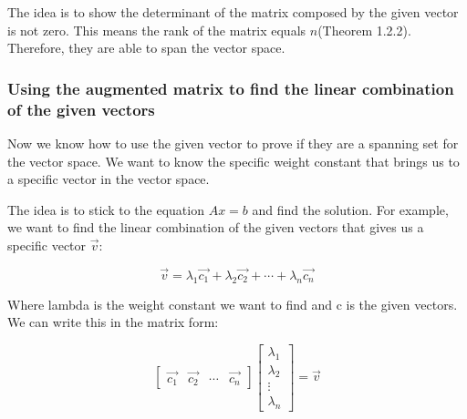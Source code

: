 \documentclass[oneside]{book}
\begin{document}
The idea is to show the determinant of the matrix composed by the given vector is not zero. This means the rank of the matrix equals $n$(Theorem 1.2.2). Therefore, they are able to span the vector space.



\subsubsection{Using the augmented matrix to find the linear combination of the given vectors}
Now we know how to use the given vector to prove if they are a spanning set for the vector space. We want to know the specific weight constant that brings us to a specific vector in the vector space.

The idea is to stick to the equation $Ax = b$ and find the solution. 
For example, we want to find the linear combination of the given vectors that gives us a specific vector $\vec{v}$:

\[
    \vec{v} = \lambda_1\vec{c_1} + \lambda_2\vec{c_2} + \cdots + \lambda_n\vec{c_n}
\]

Where lambda is the weight constant we want to find and c is the given vectors. We can write this in the matrix form:

\[
    \begin{bmatrix}
        \vec{c_1} & \vec{c_2} & \cdots & \vec{c_n}
    \end{bmatrix}
    \begin{bmatrix}
        \lambda_1\\ \lambda_2\\ \vdots \\ \lambda_n
    \end{bmatrix}
     = \vec{v}
\]
\end{document}
